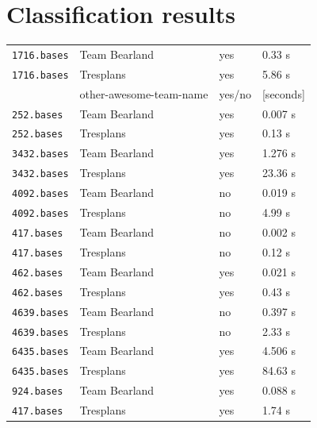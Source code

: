 \documentclass[11pt]{amsart}
\begin{document}
\section{Classification results}

\begin{center}
  \begin{tabular}[c]{llll}
    \hline
    \texttt{1716.bases}
    & Team Bearland
    & yes
    & 0.33 s
    \\
    \texttt{1716.bases}
    & Tresplans
    & yes
    & 5.86 s
    \\
    & other-awesome-team-name
    & yes/no
    & [seconds]
    \\\hline
      \texttt{252.bases}
    & Team Bearland
    & yes
    & 0.007 s
    \\
    \texttt{252.bases}
    & Tresplans
    & yes
    & 0.13 s
    \\\hline
      \texttt{3432.bases}
    & Team Bearland
    & yes
    & 1.276 s
    \\
    \texttt{3432.bases}
    & Tresplans
    & yes
    & 23.36 s
    \\\hline
      \texttt{4092.bases}
    & Team Bearland
    & no
    & 0.019 s
    \\
    \texttt{4092.bases}
    & Tresplans
    & no
    & 4.99 s
    \\\hline
      \texttt{417.bases}
    & Team Bearland
    & no
    & 0.002 s
    \\
    \texttt{417.bases}
    & Tresplans
    & no
    & 0.12 s
    \\\hline
      \texttt{462.bases}
    & Team Bearland
    & yes
    & 0.021 s
    \\
    \texttt{462.bases}
    & Tresplans
    & yes
    & 0.43 s
    \\\hline
      \texttt{4639.bases}
    & Team Bearland
    & no
    & 0.397 s
    \\
    \texttt{4639.bases}
    & Tresplans
    & no
    & 2.33 s
    \\\hline
    \texttt{6435.bases}
    & Team Bearland
    & yes
    & 4.506 s
    \\
    \texttt{6435.bases}
    & Tresplans
    & yes
    & 84.63 s
    \\\hline
    \texttt{924.bases}
    & Team Bearland
    & yes
    & 0.088 s
    \\
    \texttt{417.bases}
    & Tresplans
    & yes
    & 1.74 s
    \\\hline
  \end{tabular}
\end{center}
\end{document}
